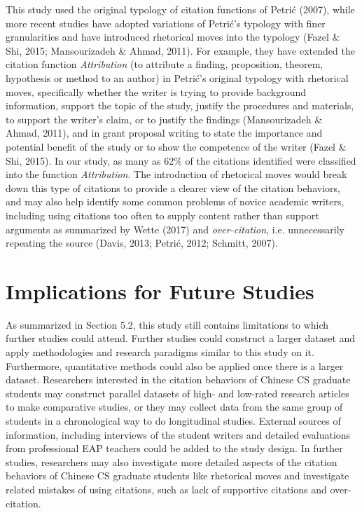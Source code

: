 This study used the original typology of citation functions of Petrić (2007), while more recent studies have adopted variations of Petrić’s typology with finer granularities and have introduced rhetorical moves into the typology (Fazel \& Shi, 2015; Mansourizadeh \& Ahmad, 2011). For example, they have extended the citation function \textit{Attribution} (to attribute a finding, proposition, theorem, hypothesis or method to an author) in Petrić’s original typology with rhetorical moves, specifically whether the writer is trying to provide background information, support the topic of the study, justify the procedures and materials, to support the writer’s claim, or to justify the findings (Mansourizadeh \& Ahmad, 2011), and in grant proposal writing to state the importance and potential benefit of the study or to show the competence of the writer (Fazel \& Shi, 2015). In our study, as many as 62\% of the citations identified were classified into the function \textit{Attribution}. The introduction of rhetorical moves would break down this type of citations to provide a clearer view of the citation behaviors, and may also help identify some common problems of novice academic writers, including using citations too often to supply content rather than support arguments as summarized by Wette (2017) and \textit{over-citation}, i.e. unnecessarily repeating the source (Davis, 2013; Petrić, 2012; Schmitt, 2007).

\section{Implications for Future Studies}
As summarized in Section 5.2, this study still contains limitations to which further studies could attend. Further studies could construct a larger dataset and apply methodologies and research paradigms similar to this study on it. Furthermore, quantitative methods could also be applied once there is a larger dataset. Researchers interested in the citation behaviors of Chinese CS graduate students may construct parallel datasets of high- and low-rated research articles to make comparative studies, or they may collect data from the same group of students in a chronological way to do longitudinal studies. External sources of information, including interviews of the student writers and detailed evaluations from professional EAP teachers could be added to the study design. In further studies, researchers may also investigate more detailed aspects of the citation behaviors of Chinese CS graduate students like rhetorical moves and investigate related mistakes of using citations, such as lack of supportive citations and over-citation.

